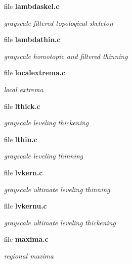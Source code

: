 \begin{CompactItemize}
\item 
file \bf{lambdaskel.c}
\begin{CompactList}\small\item\em grayscale filtered topological skeleton \item\end{CompactList}

\item 
file \bf{lambdathin.c}
\begin{CompactList}\small\item\em grayscale homotopic and filtered thinning \item\end{CompactList}

\item 
file \bf{localextrema.c}
\begin{CompactList}\small\item\em local extrema \item\end{CompactList}

\item 
file \bf{lthick.c}
\begin{CompactList}\small\item\em grayscale leveling thickening \item\end{CompactList}

\item 
file \bf{lthin.c}
\begin{CompactList}\small\item\em grayscale leveling thinning \item\end{CompactList}

\item 
file \bf{lvkern.c}
\begin{CompactList}\small\item\em grayscale ultimate leveling thinning \item\end{CompactList}

\item 
file \bf{lvkernu.c}
\begin{CompactList}\small\item\em grayscale ultimate leveling thickening \item\end{CompactList}

\item 
file \bf{maxima.c}
\begin{CompactList}\small\item\em regional maxima \item\end{CompactList}


\end{CompactItemize}
